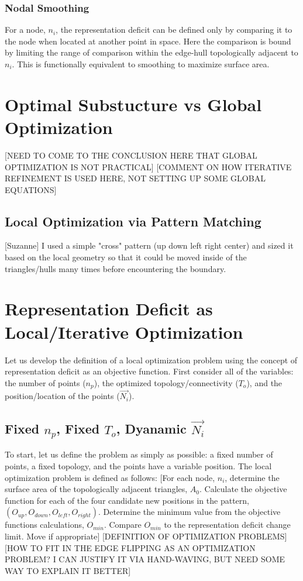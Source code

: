 \documentclass[11pt]{article}
\begin{document}
\subsubsection{Nodal Smoothing}
For a node, $n_i$, the representation deficit can be defined only by
comparing it to the node when located at another point in space. Here
the comparison is bound by limiting the range of comparison within the
edge-hull topologically adjacent to $n_i$. This is functionally
equivalent to smoothing to maximize surface area.

\section{Optimal Substucture vs Global Optimization}
[NEED TO COME TO THE CONCLUSION HERE THAT GLOBAL OPTIMIZATION IS NOT
PRACTICAL] [COMMENT ON HOW ITERATIVE REFINEMENT IS USED HERE, NOT
SETTING UP SOME GLOBAL EQUATIONS]
\subsection{Local Optimization via Pattern Matching}
[Suzanne] I used a simple "cross" pattern (up down left right center)
and sized it based on the local geometry so that it could be moved
inside of the triangles/hulls many times before encountering the
boundary.

\section{Representation Deficit as Local/Iterative Optimization}
Let us develop the definition of a local optimization problem using the
concept of representation deficit as an objective function. First
consider all of the variables: the number of points ($n_p$), the
optimized topology/connectivity ($T_o$), and the position/location of
the points ($\vec{N_i}$).
\subsection{Fixed $n_p$, Fixed $T_o$, Dyanamic $\vec{N_i}$}
To start, let us define the problem as simply as possible: a fixed
number of points, a fixed topology, and the points have a variable
position.  The local optimization problem is defined as follows: [For
each node, $n_i$, determine the surface area of the topologically
adjacent triangles, $A_0$. Calculate the objective function for each of
the four candidate new positions in the pattern, $\left(O_{up},
O_{down}, O_{left}, O_{right}\right)$. Determine the minimum value from
the objective functions calculations, $O_{min}$. Compare $O_{min}$ to
the representation deficit change limit. Move if appropriate]
[DEFINITION OF OPTIMIZATION PROBLEMS]
[HOW TO FIT IN THE EDGE FLIPPING AS AN OPTIMIZATION PROBLEM? I CAN
JUSTIFY IT VIA HAND-WAVING, BUT NEED SOME WAY TO EXPLAIN IT BETTER]
\end{document}
